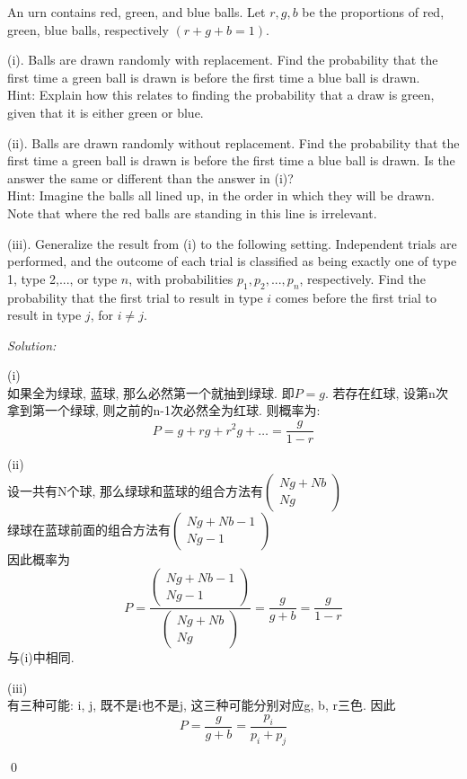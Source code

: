 \documentclass[12pt]{article}
\newenvironment{problem}[2][Problem]{\begin{trivlist}
\item[\hskip \labelsep {\bfseries #1}\hskip \labelsep {\bfseries #2.}]}{\end{trivlist}}
\newenvironment{sol}
    {\emph{Solution:}
    }
    {
    \qed
    }
\newcommand{\f}[2]{\frac{#1}{#2}}                                      %
\begin{document}
\begin{problem}{7}
An urn contains red, green, and blue balls. Let $r, g, b$ be the proportions of red, green, blue balls, respectively
$(r + g + b = 1)$.

(i). Balls are drawn randomly with replacement. Find the probability that the first time a green ball is drawn is before the first time a blue ball is drawn.\\
Hint: Explain how this relates to finding the probability that a draw is green, given that it is either green or blue.

(ii). Balls are drawn randomly without replacement. Find the probability that the first time a green ball is
drawn is before the first time a blue ball is drawn. Is the answer the same or different than the answer
in (i)?\\
Hint: Imagine the balls all lined up, in the order in which they will be drawn. Note that where the red
balls are standing in this line is irrelevant.

(iii). Generalize the result from (i) to the following setting. Independent trials are performed, and the outcome of each trial is classified as being exactly one of type 1, type 2,..., or type $n$, with probabilities $p_1,p_2,...,p_n$, respectively. Find the probability that the first trial to result in type $i$ comes before the first trial to result in type $j$, for $i\neq j$.

\end{problem}
\begin{sol}

(i)\\
如果全为绿球, 蓝球, 那么必然第一个就抽到绿球. 即$P=g$. 若存在红球, 设第n次拿到第一个绿球, 则之前的n-1次必然全为红球. 则概率为: 
$$P = g +rg + r^2g +\dots = \f{g}{1-r}$$

(ii)\\
设一共有N个球, 那么绿球和蓝球的组合方法有$\left( \begin{matrix} Ng+Nb \\ Ng \end{matrix} \right)$\\
绿球在蓝球前面的组合方法有$\left( \begin{matrix} Ng+Nb-1 \\ Ng-1 \end{matrix} \right)$\\
因此概率为$$P=\f{\left( \begin{matrix} Ng+Nb-1 \\ Ng-1 \end{matrix} \right)}{\left( \begin{matrix} Ng+Nb \\ Ng \end{matrix} \right)}=\f{g}{g+b}=\f{g}{1-r}$$
与(i)中相同. 

    (iii)\\
有三种可能: i, j, 既不是i也不是j, 这三种可能分别对应g, b, r三色. 因此
$$P = \f{g}{g+b} = \f{p_i}{p_i+p_j}$$
\end{sol}
\end{document}
